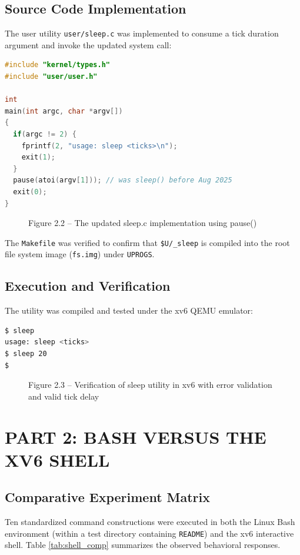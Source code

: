\documentclass[12pt,a4paper]{report}
\numberwithin{equation}{chapter}
\numberwithin{figure}{chapter}
\numberwithin{table}{chapter}
\begin{document}
\section{Source Code Implementation}
The user utility \texttt{user/sleep.c} was implemented to consume a tick duration argument and invoke the updated system call:

\begin{lstlisting}[language=c]
#include "kernel/types.h"
#include "user/user.h"

int
main(int argc, char *argv[])
{
  if(argc != 2) {
    fprintf(2, "usage: sleep <ticks>\n");
    exit(1);
  }
  pause(atoi(argv[1])); // was sleep() before Aug 2025
  exit(0);
}
\end{lstlisting}

\begin{figure}[H]
\centering
\caption{Figure 2.2 -- The updated sleep.c implementation using pause()}
\end{figure}

The \texttt{Makefile} was verified to confirm that \texttt{\$U/\_sleep} is compiled into the root file system image (\texttt{fs.img}) under \texttt{UPROGS}.

\section{Execution and Verification}
The utility was compiled and tested under the xv6 QEMU emulator:

\begin{lstlisting}[language=bash]
$ sleep
usage: sleep <ticks>
$ sleep 20
$
\end{lstlisting}

\begin{figure}[H]
\centering
\caption{Figure 2.3 -- Verification of sleep utility in xv6 with error validation and valid tick delay}
\end{figure}

\chapter{PART 2: BASH VERSUS THE XV6 SHELL}

\section{Comparative Experiment Matrix}
Ten standardized command constructions were executed in both the Linux Bash environment (within a test directory containing \texttt{README}) and the xv6 interactive shell. Table \ref{tab:shell_comp} summarizes the observed behavioral responses.
\end{document}
